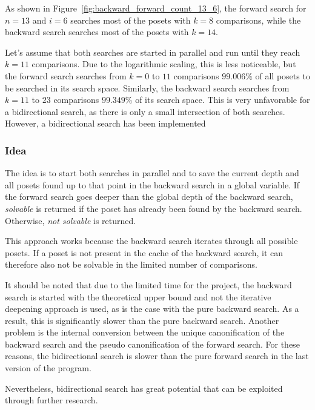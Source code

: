 \documentclass[10pt,journal,compsoc]{IEEEtran}
\begin{document}
As shown in Figure~\ref{fig:backward_forward_count_13_6}, the forward search for $n = 13$ and $i = 6$ searches most of the posets with $k = 8$ comparisons, while the backward search searches most of the posets with $k = 14$.

Let's assume that both searches are started in parallel and run until they reach $k = 11$ comparisons.
Due to the logarithmic scaling, this is less noticeable, but the forward search searches from $k = 0$ to $11$ comparisons $99.006\%$ of all posets to be searched in its search space.
Similarly, the backward search searches from $k = 11$ to $23$ comparisons $99.349\%$ of its search space.
This is very unfavorable for a bidirectional search, as there is only a small intersection of both searches.
However, a bidirectional search has been implemented

\subsubsection{Idea}

The idea is to start both searches in parallel and to save the current depth and all posets found up to that point in the backward search in a global variable.
If the forward search goes deeper than the global depth of the backward search, \textit{solvable} is returned if the poset has already been found by the backward search.
Otherwise, \textit{not solvable} is returned.

This approach works because the backward search iterates through all possible posets.
If a poset is not present in the cache of the backward search, it can therefore also not be solvable in the limited number of comparisons.

It should be noted that due to the limited time for the project, the backward search is started with the theoretical upper bound and not the iterative deepening approach is used, as is the case with the pure backward search.
As a result, this is significantly slower than the pure backward search.
Another problem is the internal conversion between the unique canonification of the backward search and the pseudo canonification of the forward search.
For these reasons, the bidirectional search is slower than the pure forward search in the last version of the program.

Nevertheless, bidirectional search has great potential that can be exploited through further research.


\end{document}
